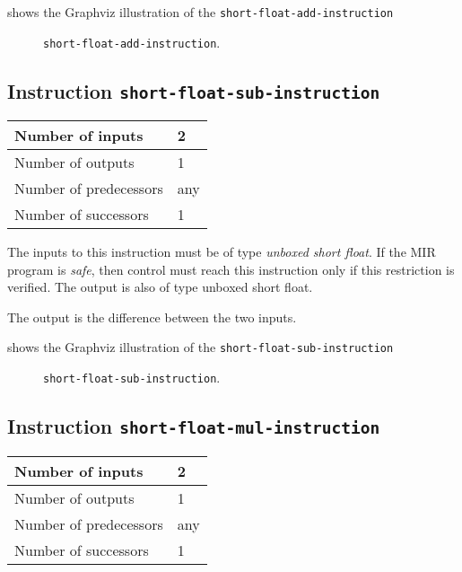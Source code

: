  shows the Graphviz illustration of the
\texttt{short-float-add-instruction}

\begin{figure}
\begin{center}
\end{center}
\caption{\label{fig-short-float-add-instruction}
\texttt{short-float-add-instruction}.}
\end{figure}

\subsection{Instruction \texttt{short-float-sub-instruction}}
\label{mir-instruction-short-float-sub}

\begin{tabular}{|l|l|}
\hline
Number of inputs & 2\\
\hline
Number of outputs & 1\\
\hline
Number of predecessors & any\\
\hline
Number of successors & 1\\
\hline
\end{tabular}

The inputs to this instruction must be of type \emph{unboxed short
  float}.  If the MIR program is \emph{safe}, then control must reach
this instruction only if this restriction is verified.  The output is
also of type unboxed short float.

The output is the difference between the two inputs.

 shows the Graphviz illustration of the
\texttt{short-float-sub-instruction}

\begin{figure}
\begin{center}
\end{center}
\caption{\label{fig-short-float-sub-instruction}
\texttt{short-float-sub-instruction}.}
\end{figure}

\subsection{Instruction \texttt{short-float-mul-instruction}}
\label{mir-instruction-short-float-mul}

\begin{tabular}{|l|l|}
\hline
Number of inputs & 2\\
\hline
Number of outputs & 1\\
\hline
Number of predecessors & any\\
\hline
Number of successors & 1\\
\hline
\end{tabular}

